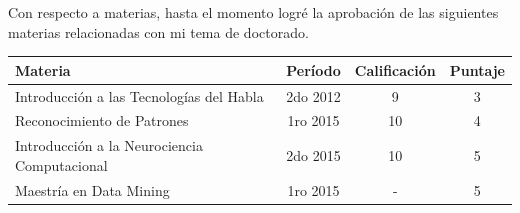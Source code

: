 \documentclass{article}
\begin{document}
Con respecto a materias, hasta el momento logré la aprobación de las siguientes materias relacionadas con mi tema de doctorado.

\hfill

\centering
\begin{tabular}{l c c c}

\textsf{Materia} & \textsf{Período} & \textsf{Calificación} & \textsf{Puntaje}\\
\hline
Introducción a las Tecnologías del Habla & 2do 2012 & 9 & 3\\
Reconocimiento de Patrones & 1ro 2015 & 10 & 4\\
Introducción a la Neurociencia Computacional & 2do 2015 & 10  & 5 \\
Maestría en Data Mining & 1ro 2015 & -  & 5 \\ 
\hline
\end{tabular}



\end{document}
